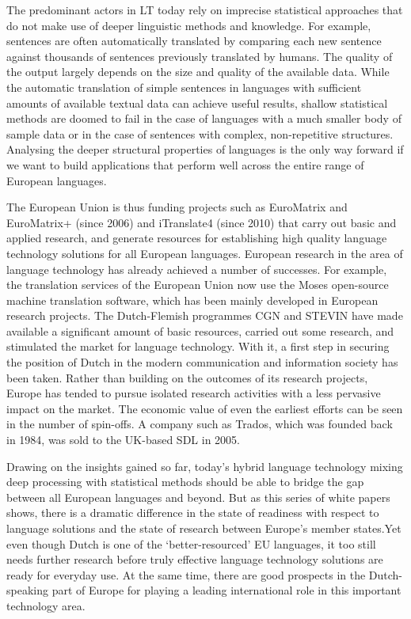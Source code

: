 \documentclass[]{../../metanetpaper}
\begin{document}
\begin{multicols}{2}
The predominant actors in LT today rely on imprecise statistical approaches that do not make use of deeper linguistic methods and knowledge. For example, sentences are often automatically translated by comparing each new sentence against thousands of sentences previously translated by humans. The quality of the output largely depends on the size and quality of the available  data. While the automatic translation of simple sentences in languages with sufficient amounts of available textual data can achieve useful results, shallow statistical methods are doomed to fail in the case of languages with a much smaller body of sample data or in the case of sentences with complex, non-repetitive structures. Analysing the deeper structural properties of languages is the only way forward if we want to build applications that perform well across the entire range of European languages.


The European Union is thus funding projects such as EuroMatrix and EuroMatrix+ (since 2006) and iTranslate4 (since 2010) that carry out basic and applied research, and generate resources for establishing high quality language technology solutions for all European languages. 
European research in the area of language technology has already achieved a number of successes. For example, the translation services of the European Union now use the Moses open-source machine translation software, which has been mainly developed in European research projects. The Dutch-Flemish programmes CGN and STEVIN have made available a significant amount of basic resources, carried out some research, and stimulated the market for language technology. With it, a first step in securing the position of Dutch in the modern communication and information society has been taken. Rather than building on the outcomes of its research projects, Europe has tended to pursue isolated research activities with a less pervasive impact on the market. The economic value of even the earliest efforts can be seen in the number of spin-offs. A company such as Trados, which was founded back in 1984, was sold to the UK-based SDL in 2005.


Drawing on the insights gained so far, today’s hybrid language technology mixing deep processing with statistical methods should be able to bridge the gap between all European languages and beyond. But as this series of white papers shows, there is a dramatic difference in the state of readiness with respect to language solutions and the state of research between Europe’s member states.Yet even though Dutch is one of the `better-resourced' EU languages, it too still needs further research before truly effective language technology solutions are ready for everyday use. At the same time, there are good prospects in the Dutch-speaking part of Europe for playing a leading international role in this important technology area.


\end{multicols}
\end{document}
